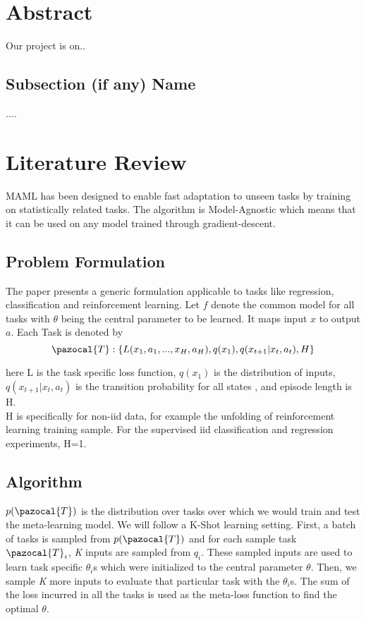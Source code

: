 \documentclass[a4paper]{article}
\newcommand{\Tb}{\pazocal{T}}
\begin{document}



\section*{Abstract}

Our project is on..

\subsection*{Subsection (if any) Name}

....

\section{Literature Review}

MAML has been designed to enable fast adaptation to unseen tasks by training on statistically related tasks. The algorithm is Model-Agnostic which means that it can be used on any model trained through gradient-descent.

\subsection{Problem Formulation}
The paper presents a generic formulation applicable to tasks like regression, classification and reinforcement learning. Let $f$ denote the common model for all tasks with $\theta$ being the central parameter to be learned. It maps input $x$ to output $a$. Each Task is denoted by $$\Tb: \{{L}({x_1}, {a_1}, ... , {x_H}, {a_H}),q({x_1}),q({x_{t+1}}|{x_t,a_t}),H\}$$

here L is the task specific loss function, $q(x_1)$ is the distribution of inputs, $q(x_{t+1} |x_t,a_t )$ is the transition probability for all states , and episode length is H. \\
H is specifically for non-iid data, for example the unfolding of reinforcement learning training sample. For the supervised iid classification and regression experiments, H=1.

\subsection{Algorithm}
$p(\Tb)$ is the distribution over tasks over which we would train and test the meta-learning model. We will follow a K-Shot learning setting. First, a batch of tasks is sampled from $p(\Tb)$ and for each sample task $\Tb_i$, \textit{K} inputs are sampled from $q_i$. These sampled inputs are used to learn task specific $\theta_i$s which were initialized to the central parameter $\theta$. Then, we sample \textit{K} more inputs to evaluate that particular task with the $\theta_i$s. The sum of the loss incurred in all the tasks is used as the meta-loss function to find the optimal $\theta$. 
\end{document}
